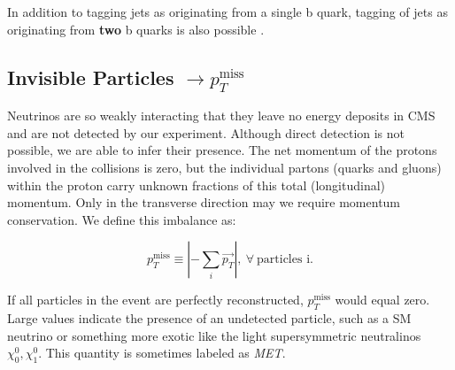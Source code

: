 In addition to tagging jets as originating from a single b quark, tagging of jets as originating from \textbf{two} b quarks is also possible \cite{bbtagger}.

\subsection{Invisible Particles $\rightarrow p_{T}^{\mathrm{miss}}$}

Neutrinos are so weakly interacting that they leave no energy deposits in CMS and are not detected by our experiment. Although direct detection is not possible, we are able to infer their presence. The net momentum of the protons involved in the collisions is zero, but the individual partons (quarks and gluons) within the proton carry unknown fractions of this total (longitudinal) momentum. Only in the transverse direction may we require momentum conservation. We define this imbalance as:

\begin{equation}
p_{T}^{\mathrm{miss}}  \equiv \left | - \sum_{i} \vec{p_{T}} \right |,~\forall~\textrm{particles~i}.
\end{equation}

If all particles in the event are perfectly reconstructed, $p_{T}^{\mathrm{miss}}$ would equal zero. Large values indicate the presence of an undetected particle, such as a SM neutrino or something more exotic like the light supersymmetric neutralinos $\chi^{0}_{0}, \chi^{0}_{1}$. This quantity is sometimes labeled as \textit{MET}.